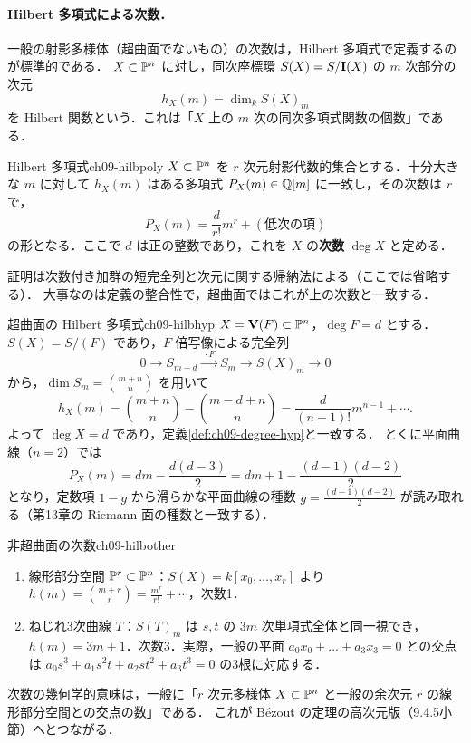 \paragraph{Hilbert 多項式による次数．}
一般の射影多様体（超曲面でないもの）の次数は，Hilbert 多項式で定義するのが標準的である．
$X\subset\mathbb{P}^n$ に対し，同次座標環 $S(X)=S/\mathbf{I}(X)$ の $m$ 次部分の次元
\[
  h_X(m)=\dim_k S(X)_m
\]
を Hilbert 関数という．これは「$X$ 上の $m$ 次の同次多項式関数の個数」である．

\begin{mythm}{Hilbert 多項式}{ch09-hilbpoly}
$X\subset\mathbb{P}^n$ を $r$ 次元射影代数的集合とする．十分大きな $m$ に対して $h_X(m)$ はある多項式 $P_X(m)\in\mathbb{Q}[m]$ に一致し，その次数は $r$ で，
\[
  P_X(m)=\frac{d}{r!}m^r+(\text{低次の項})
\]
の形となる．ここで $d$ は正の整数であり，これを $X$ の\textbf{次数} $\deg X$ と定める．
\end{mythm}

証明は次数付き加群の短完全列と次元に関する帰納法による（ここでは省略する）．
大事なのは定義の整合性で，超曲面ではこれが上の次数と一致する．

\begin{myex}{超曲面の Hilbert 多項式}{ch09-hilbhyp}
$X=\mathbf{V}(F)\subset\mathbb{P}^n$，$\deg F=d$ とする．$S(X)=S/(F)$ であり，$F$ 倍写像による完全列
\[
  0\to S_{m-d}\xrightarrow{\ \cdot F\ }S_m\to S(X)_m\to0
\]
から，$\dim S_m=\binom{m+n}{n}$ を用いて
\[
  h_X(m)=\binom{m+n}{n}-\binom{m-d+n}{n}=\frac{d}{(n-1)!}m^{n-1}+\cdots.
\]
よって $\deg X=d$ であり，定義\ref{def:ch09-degree-hyp}と一致する．
とくに平面曲線（$n=2$）では
\[
  P_X(m)=dm-\frac{d(d-3)}{2}=dm+1-\frac{(d-1)(d-2)}{2}
\]
となり，定数項 $1-g$ から滑らかな平面曲線の種数 $g=\frac{(d-1)(d-2)}{2}$ が読み取れる（第13章の Riemann 面の種数と一致する）．
\end{myex}

\begin{myex}{非超曲面の次数}{ch09-hilbother}
\begin{enumerate}
  \item 線形部分空間 $\mathbb{P}^r\subset\mathbb{P}^n$：$S(X)=k[x_0,\dots,x_r]$ より $h(m)=\binom{m+r}{r}=\frac{m^r}{r!}+\cdots$，次数1．
  \item ねじれ3次曲線 $T$：$S(T)_m$ は $s,t$ の $3m$ 次単項式全体と同一視でき，$h(m)=3m+1$．次数3．実際，一般の平面 $a_0x_0+\dots+a_3x_3=0$ との交点は $a_0s^3+a_1s^2t+a_2st^2+a_3t^3=0$ の3根に対応する．
\end{enumerate}
\end{myex}

次数の幾何学的意味は，一般に「$r$ 次元多様体 $X\subset\mathbb{P}^n$ と一般の余次元 $r$ の線形部分空間との交点の数」である．
これが Bézout の定理の高次元版（9.4.5小節）へとつながる．

